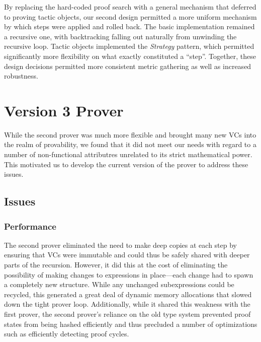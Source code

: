 By replacing the hard-coded proof search with a general mechanism that deferred to proving tactic objects, our second design permitted a more uniform mechanism by which steps were applied and rolled back.  The basic implementation remained a recursive one, with backtracking falling out naturally from unwinding the recursive loop.  Tactic objects implemented the \emph{Strategy} pattern, which permitted significantly more flexibility on what exactly constituted a ``step''.  Together, these design decisions permitted more consistent metric gathering as well as increased robustness.


\section{Version 3 Prover}

While the second prover was much more flexible and brought many new VCs into the realm of provability, we found that it did not meet our needs with regard to a number of non-functional attributres unrelated to its strict mathematical power.  This motivated us to develop the current version of the prover to address these issues.

	\subsection{Issues}	%

		\subsubsection{Performance}	

The second prover eliminated the need to make deep copies at each step by ensuring that VCs were immutable and could thus be safely shared with deeper parts of the recursion.  However, it did this at the cost of eliminating the possibility of making changes to expressions in place---each change had to spawn a completely new structure.  While any unchanged subexpressions could be recycled, this generated a great deal of dynamic memory allocations that slowed down the tight prover loop.  Additionally, while it shared this weakness with the first prover, the second prover's reliance on the old type system prevented proof states from being hashed efficiently and thus precluded a number of optimizations such as efficiently detecting proof cycles.


